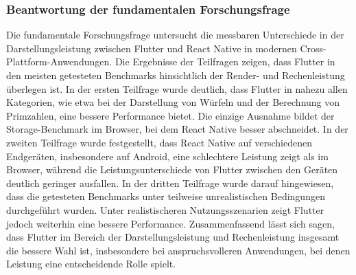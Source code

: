 \subsubsection{Beantwortung der fundamentalen Forschungsfrage}
Die fundamentale Forschungsfrage untersucht die messbaren Unterschiede in der Darstellungsleistung zwischen Flutter und React Native in modernen Cross-Plattform-Anwendungen. Die Ergebnisse der Teilfragen zeigen, dass Flutter in den meisten getesteten Benchmarks hinsichtlich der Render- und Rechenleistung überlegen ist. In der ersten Teilfrage wurde deutlich, dass Flutter in nahezu allen Kategorien, wie etwa bei der Darstellung von Würfeln und der Berechnung von Primzahlen, eine bessere Performance bietet. Die einzige Ausnahme bildet der Storage-Benchmark im Browser, bei dem React Native besser abschneidet. In der zweiten Teilfrage wurde festgestellt, dass React Native auf verschiedenen Endgeräten, insbesondere auf Android, eine schlechtere Leistung zeigt als im Browser, während die Leistungsunterschiede von Flutter zwischen den Geräten deutlich geringer ausfallen. In der dritten Teilfrage wurde darauf hingewiesen, dass die getesteten Benchmarks unter teilweise unrealistischen Bedingungen durchgeführt wurden. Unter realistischeren Nutzungsszenarien zeigt Flutter jedoch weiterhin eine bessere Performance. Zusammenfassend lässt sich sagen, dass Flutter im Bereich der Darstellungsleistung und Rechenleistung insgesamt die bessere Wahl ist, insbesondere bei anspruchsvolleren Anwendungen, bei denen Leistung eine entscheidende Rolle spielt.